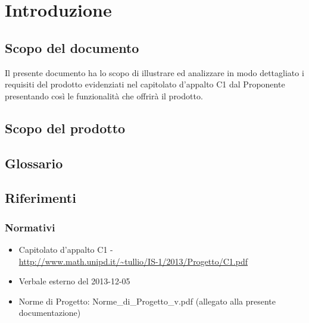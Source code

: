 \newpage
\tableofcontents

\newpage
\listoftables
\listoffigures

\newpage
\section{Introduzione}%
\subsection{Scopo del documento}%
Il presente documento ha lo scopo di illustrare ed analizzare in modo dettagliato i requisiti del prodotto  evidenziati nel capitolato d'appalto C1 dal Proponente \Prop{} presentando così le funzionalità che offrirà il prodotto.

\subsection{Scopo del prodotto} %
\Prodotto{}
\subsection{Glossario}%
\Glossario{}

\subsection{Riferimenti} %
\subsubsection{Normativi} %


\begin{itemize}
\item Capitolato d'appalto C1 - \Progetto{} \\
\url{http://www.math.unipd.it/~tullio/IS-1/2013/Progetto/C1.pdf}
\item Verbale esterno del 2013-12-05
\item Norme di Progetto: Norme\_{}di\_{}Progetto\_{}v\versioneNormeDiProgetto{}.pdf  (allegato alla presente documentazione)\\
\end{itemize}


